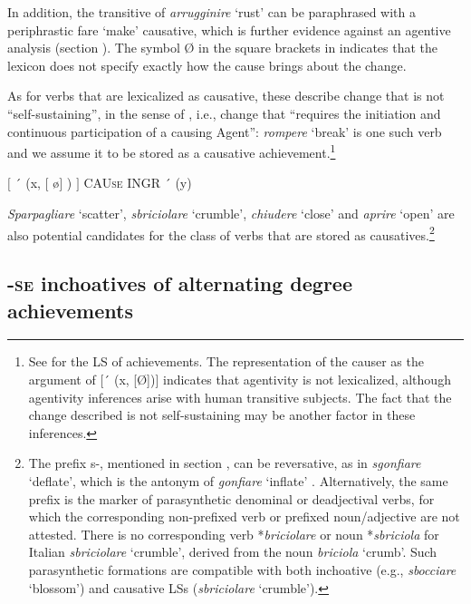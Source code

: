 \documentclass[output=paper,colorlinks,citecolor=brown
]{langscibook}
\begin{document}
In addition, the transitive of \textit{arrugginire} ‘rust’ can be paraphrased with a periphrastic fare ‘make’ causative, which is further evidence against an agentive analysis (section ). The symbol Ø in the square brackets in  indicates that the lexicon does not specify exactly how the cause brings about the change.

As for verbs that are lexicalized as causative, these describe change that is not “self-sustaining”, in the sense of \citet[496]{kiparsky1997remarks}, i.e., change that “requires the initiation and continuous participation of a causing Agent”: \textit{rompere} ‘break’ is one such verb and we assume it to be stored as a causative achievement.\footnote{See \citet[114]{vanvalin2023principles} for the LS of achievements. The representation of the causer as the argument of [´ (x, [Ø])] indicates  that agentivity is not lexicalized, although agentivity inferences arise with human transitive subjects. The fact that the change described is not self-sustaining may be another factor in these inferences.}

\ea \label{bentley_example_47}
    $\lbrack$ ´ (x, $\lbrack$ \o $\rbrack$ ) $\rbrack$ CAU\textsc{se} INGR ´ (y)
\z

\textit{Sparpagliare} ‘scatter’, \textit{sbriciolare} ‘crumble’, \textit{chiudere} ‘close’ and \textit{aprire} ‘open’ are also potential candidates for the class of verbs that are stored as causatives.\footnote{The prefix s-, mentioned in section , can be reversative, as in \textit{sgonfiare} ‘deflate’, which is the antonym of \textit{gonfiare} ‘inflate’ \citep{iacobini2004prefissazione}. Alternatively, the same prefix is the marker of parasynthetic denominal or deadjectival verbs, for which the corresponding non-prefixed verb or prefixed noun/adjective are not attested. There is no corresponding verb *\textit{briciolare} or noun *\textit{sbriciola} for Italian \textit{sbriciolare} ‘crumble’, derived from the noun \textit{briciola} ‘crumb’. Such parasynthetic formations are compatible with both inchoative (e.g., \textit{sbocciare} ‘blossom’) and causative LSs (\textit{sbriciolare} ‘crumble’).}

\subsection{-\textsc{se} inchoatives of alternating degree achievements}
\label{bentley_section_5.3}
\end{document}
